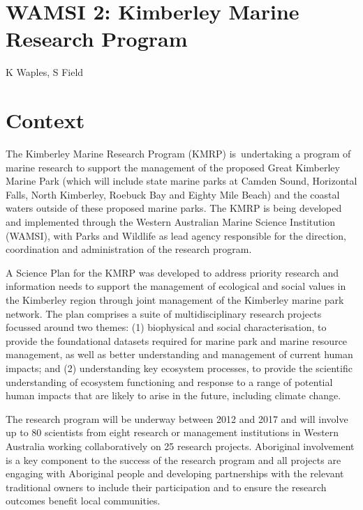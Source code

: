 \documentclass[version=last,
    paper=a4, %
    10pt, %
    usenames,
    dvipsnames,
    oneside, %
    headings=openany, %
    DIV=15 %
]{scrbook}
\begin{document}
\section*{WAMSI 2: Kimberley Marine Research Program
}

K Waples, S Field


\section*{Context}
The Kimberley Marine Research Program (KMRP) is~undertaking a program of
marine research to support the management of the proposed Great
Kimberley Marine Park (which will include state marine parks at Camden
Sound, Horizontal Falls, North Kimberley, Roebuck Bay and Eighty Mile
Beach) and the coastal waters outside of these proposed marine parks.
The KMRP is being developed and implemented through the Western
Australian Marine Science Institution (WAMSI), with Parks and Wildlife
as lead agency responsible for the direction, coordination and
administration of the research program.

A Science Plan for the KMRP was developed to address priority research
and information needs to support the management of ecological and social
values in the Kimberley region through joint management of the Kimberley
marine park network. The plan comprises a suite of multidisciplinary
research projects focussed around two themes: (1) biophysical and social
characterisation, to provide the foundational datasets required for
marine park and marine resource management, as well as better
understanding and management of current human impacts; and (2)
understanding key ecosystem processes, to provide the scientific
understanding of ecosystem functioning and response to a range of
potential human impacts that are likely to arise in the future,
including climate change.

The research program will be underway between 2012 and 2017 and will
involve up to 80 scientists from eight research or management
institutions in Western Australia working collaboratively on 25 research
projects. Aboriginal involvement is a key component to the success of
the research program and all projects are engaging with Aboriginal
people and developing partnerships with the relevant traditional owners
to include their participation and to ensure the research outcomes
benefit local communities.
\end{document}
